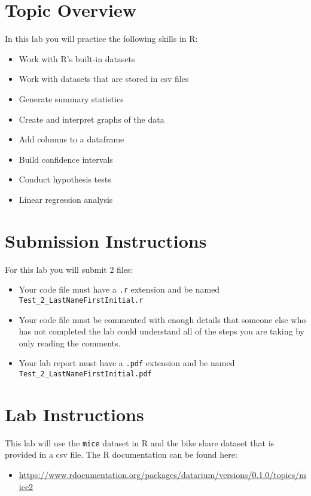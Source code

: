 \documentclass{article}
\begin{document}
\section*{Topic Overview}

In this lab you will practice the following skills in R:

\begin{itemize}
    \item Work with R’s built-in datasets
    \item Work with datasets that are stored in csv files
    \item Generate summary statistics
    \item Create and interpret graphs of the data
    \item Add columns to a dataframe
    \item Build confidence intervals
    \item Conduct hypothesis tests
    \item Linear regression analysis
\end{itemize}

\section*{Submission Instructions}

For this lab you will submit 2 files:

\begin{itemize}
    \item Your code file must have a \texttt{.r} extension and be named \texttt{Test\_2\_LastNameFirstInitial.r}
    \item Your code file must be commented with enough details that someone else who has not completed the lab could understand all of the steps you are taking by only reading the comments.
    \item Your lab report must have a \texttt{.pdf} extension and be named \texttt{Test\_2\_LastNameFirstInitial.pdf}
\end{itemize}

\section*{Lab Instructions}

This lab will use the \texttt{mice} dataset in R and the bike share dataset that is provided in a csv file. The R documentation can be found here:

\begin{itemize}
    \item \url{https://www.rdocumentation.org/packages/datarium/versions/0.1.0/topics/mice2}
\end{itemize}
\end{document}
